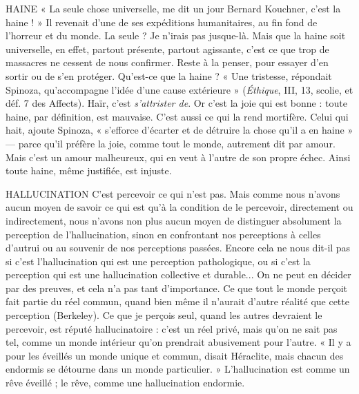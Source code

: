 HAINE  « La seule chose universelle, me dit un jour Bernard Kouchner,
c’est la haine ! » Il revenait d’une de ses expéditions humanitaires,
au fin fond de l’horreur et du monde. La seule ? Je n’irais pas jusque-là. Mais
que la haine soit universelle, en effet, partout présente, partout agissante, c’est
ce que trop de massacres ne cessent de nous confirmer. Reste à la penser, pour
essayer d’en sortir ou de s’en protéger. Qu'est-ce que la haine ? « Une tristesse,
répondait Spinoza, qu’accompagne l’idée d’une cause extérieure » ({\it Éthique}, III,
13, scolie, et déf. 7 des Affects). Haïr, c’est {\it s'attrister de}. Or c’est la joie qui est
bonne : toute haine, par définition, est mauvaise. C’est aussi ce qui la rend
mortifère. Celui qui hait, ajoute Spinoza, « s'efforce d’écarter et de détruire la
chose qu’il a en haine » — parce qu’il préfère la joie, comme tout le monde,
autrement dit par amour. Mais c’est un amour malheureux, qui en veut à
l’autre de son propre échec. Ainsi toute haine, même justifiée, est injuste.

HALLUCINATION C'est percevoir ce qui n’est pas. Mais comme nous
n'avons aucun moyen de savoir ce qui est qu’à la
condition de le percevoir, directement ou indirectement, nous n’avons non
plus aucun moyen de distinguer absolument la perception de l’hallucination,
sinon en confrontant nos perceptions à celles d’autrui ou au souvenir de nos
perceptions passées. Encore cela ne nous dit-il pas si c’est l’hallucination qui est
une perception pathologique, ou si c’est la perception qui est une hallucination
collective et durable... On ne peut en décider par des preuves, et cela n’a pas
tant d'importance. Ce que tout le monde perçoit fait partie du réel commun,
quand bien même il n’aurait d’autre réalité que cette perception (Berkeley). Ce
que je perçois seul, quand les autres devraient le percevoir, est réputé
hallucinatoire : c’est un réel privé, mais qu’on ne sait pas tel, comme un monde
intérieur qu’on prendrait abusivement pour l’autre. « Il y a pour les éveillés un
monde unique et commun, disait Héraclite, mais chacun des endormis se
détourne dans un monde particulier. » L’hallucination est comme un rêve
éveillé ; le rêve, comme une hallucination endormie.

